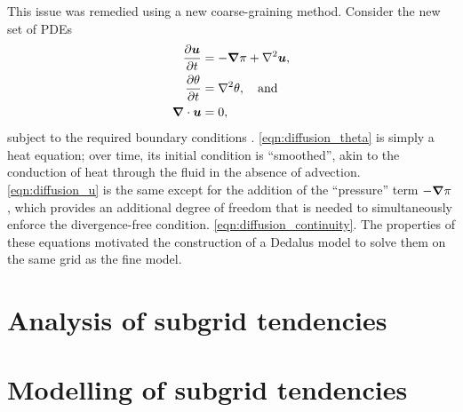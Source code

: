 \documentclass[../main.tex]{subfiles}
\begin{document}
This issue was remedied using a new coarse-graining method. Consider the new
set of PDEs
\begin{align}
    \label{eqn:diffusion_u}
    \frac{\partial \bm{u}}{\partial t} &= -\bm{\nabla} \pi + \nabla^2 \bm{u}, \\
    \label{eqn:diffusion_theta}
    \frac{\partial \theta}{\partial t} &= \nabla^2 \theta, \quad \text{and} \\
    \label{eqn:diffusion_continuity}
    \bm{\nabla} \cdot \bm{u} &= 0,
\end{align}
subject to the required boundary conditions
. \cref{eqn:diffusion_theta} is
simply a heat equation; over time, its initial condition is ``smoothed'', akin
to the conduction of heat through the fluid in the absence of advection.
\cref{eqn:diffusion_u} is the same except for the addition of the ``pressure''
term $-\bm{\nabla} \pi$, which provides an additional degree of freedom that is
needed to simultaneously enforce the divergence-free condition.
\cref{eqn:diffusion_continuity}. The properties of these equations motivated
the construction of a Dedalus model to solve them on the same grid as the
fine model.


\section{Analysis of subgrid tendencies}


\section{Modelling of subgrid tendencies}


\ifSubfilesClassLoaded{%
    \emergencystretch=5em
    \printbibliography{}
}{}
\end{document}
